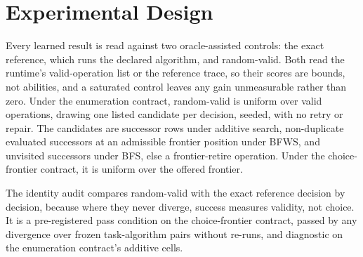\section{Experimental Design}
\label{sec:design}

Every learned result is read against two oracle-assisted controls: the exact reference, which runs the declared algorithm, and random-valid. Both read the runtime's valid-operation list or the reference trace, so their scores are bounds, not abilities, and a saturated control leaves any gain unmeasurable rather than zero. Under the enumeration contract, random-valid is uniform over valid operations, drawing one listed candidate per decision, seeded, with no retry or repair. The candidates are successor rows under additive search, non-duplicate evaluated successors at an admissible frontier position under BFWS, and unvisited successors under BFS, else a frontier-retire operation. Under the choice-frontier contract, it is uniform over the offered frontier.

The identity audit compares random-valid with the exact reference decision by decision, because where they never diverge, success measures validity, not choice. It is a pre-registered pass condition on the choice-frontier contract, passed by any divergence over frozen task-algorithm pairs without re-runs, and diagnostic on the enumeration contract's additive cells.


